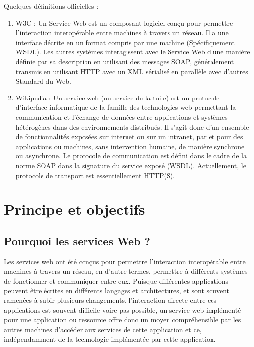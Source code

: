 Quelques définitions officielles :
\begin{enumerate}
	\item W3C :
	      Un Service Web est un composant logiciel conçu pour permettre l'interaction interopérable entre machines à travers un réseau. Il a une interface décrite en un format compris par une machine (Spécifiquement WSDL). Les autres systèmes interagissent avec le Service Web d'une manière définie par sa description en utilisant des messages SOAP, généralement transmis en utilisant HTTP avec un XML sérialisé en parallèle avec d'autres Standard du Web.\cite{W3}
	\item Wikipedia : Un service web (ou service de la toile) est un protocole d'interface informatique de la famille des technologies web permettant la communication et l'échange de données entre applications et systèmes hétérogènes dans des environnements distribués. Il s'agit donc d'un ensemble de fonctionnalités exposées sur internet ou sur un intranet, par et pour des applications ou machines, sans intervention humaine, de manière synchrone ou asynchrone. Le protocole de communication est défini dans le cadre de la norme SOAP dans la signature du service exposé (WSDL). Actuellement, le protocole de transport est essentiellement HTTP(S).\cite{Wikipedia}
\end{enumerate}

\section{Principe et objectifs}
\subsection{Pourquoi les services Web ?}
Les services web ont été conçus pour permettre l'interaction interopérable entre machines à travers un réseau, en d'autre termes, permettre à différents systèmes de fonctionner et communiquer entre eux.\newline
Puisque différentes applications peuvent être écrites en différents langages et architectures, et sont souvent ramenées à subir plusieurs changements, l’interaction directe entre ces applications est souvent difficile voire pas possible, un service web implémenté pour une application ou ressource offre donc un moyen compréhensible par les autres machines d'accéder aux services de cette application et ce, indépendamment de la technologie implémentée par cette application.
\cite{refTutorialPointsWS}
